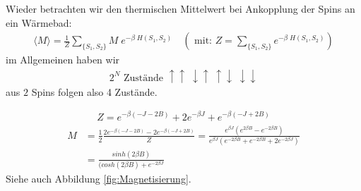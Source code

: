 \documentclass[12pt]{article}
\begin{document}
Wieder betrachten wir den thermischen Mittelwert bei Ankopplung der Spins an ein Wärmebad:
\begin{align}
\langle M \rangle = \frac{1}{Z} \sum_{ \{ S_1, S_2 \} } M \; e^{- \beta \;  H(S_1,S_2)} \quad \left(\mbox{ mit: } Z = \sum_{ \{ S_1, S_2 \} }  e^{- \beta \; H(S_1, S_2)} \right)
\end{align}
im Allgemeinen haben wir
\begin{align*}
2^N \mbox{ Zustände } \uparrow \uparrow \; \downarrow \uparrow \; \uparrow \downarrow \; \downarrow \downarrow
\end{align*}
aus $2$ Spins folgen also 4 Zustände.

\begin{align*}
Z= e^{-\beta (-J -2B)} + 2 e^{-\beta J} + e^{- \beta (-J +2B)}
\end{align*}
\begin{align*}
 M &= \frac{1}{2} \frac{2 e^{-\beta (-J - 2B)} - 2 e^{-\beta (-J + 2B)}}{Z} = \frac{e^{\beta J} \left( e^{2 \beta B} - e^{-2\beta B} \right)}{e^{\beta J} \left( e^{-2\beta B} + e^{-2 \beta B} + 2 e^{-2 \beta J} \right)} \\
 &= \frac{sinh( 2 \beta B) }{(cosh(2 \beta B) + e^{-2 \beta J}}
\end{align*}
Siehe auch Abbildung \ref{fig:Magnetisierung}.
\end{document}
